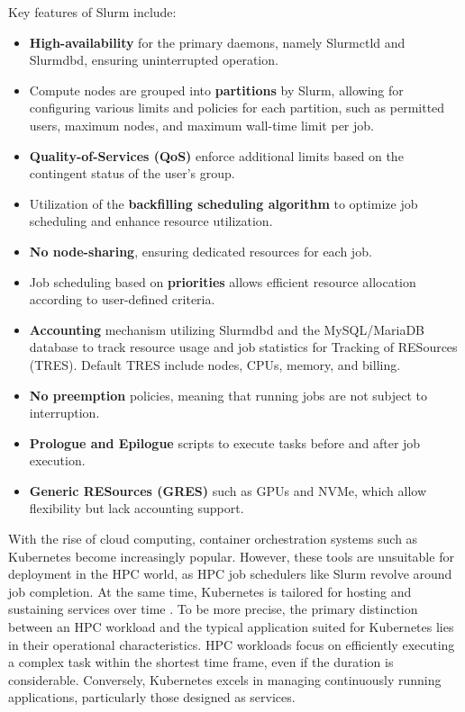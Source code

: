 


Key features of Slurm include:
\begin{itemize}
    \item \textbf{High-availability} for the primary daemons, namely Slurmctld and Slurmdbd, ensuring uninterrupted operation.
    \item Compute nodes are grouped into \textbf{partitions} by Slurm, allowing for configuring various limits and policies for each partition, such as permitted users, maximum nodes, and maximum wall-time limit per job.
    \item \textbf{Quality-of-Services (QoS)} enforce additional limits based on the contingent status of the user's group.
    \item Utilization of the \textbf{backfilling scheduling algorithm} to optimize job scheduling and enhance resource utilization.
    \item \textbf{No node-sharing}, ensuring dedicated resources for each job.
    \item Job scheduling based on \textbf{priorities} allows efficient resource allocation according to user-defined criteria.
    \item \textbf{Accounting} mechanism utilizing Slurmdbd and the MySQL/MariaDB database to track resource usage and job statistics for Tracking of RESources (TRES). Default TRES include nodes, CPUs, memory, and billing.
    \item \textbf{No preemption} policies, meaning that running jobs are not subject to interruption.
    \item \textbf{Prologue and Epilogue} scripts to execute tasks before and after job execution.
    \item \textbf{Generic RESources (GRES)} such as GPUs and NVMe, which allow flexibility but lack accounting support.
\end{itemize}


With the rise of cloud computing, container orchestration systems such as Kubernetes become increasingly popular. However, these tools are unsuitable for deployment in the HPC world, as HPC job schedulers like Slurm revolve around job completion. At the same time, Kubernetes is tailored for hosting and sustaining services over time \cite{9235080}. To be more precise, the primary distinction between an HPC workload and the typical application suited for Kubernetes lies in their operational characteristics. HPC workloads focus on efficiently executing a complex task within the shortest time frame, even if the duration is considerable. Conversely, Kubernetes excels in managing continuously running applications, particularly those designed as services.

